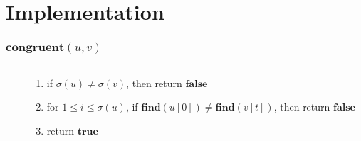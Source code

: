 \documentclass[fleqn,t]{beamer}
\begin{document}
\section{Implementation}

\begin{frame}[fragile]
  \frametitle{$\mathbf{congruent}(u, v)$}

  \begin{columns}[T]
    \begin{column}{0.5\textwidth}
    \end{column}
    \begin{column}{0.5\textwidth}
      \begin{enumerate}
        \item if $\sigma(u) \neq \sigma(v)$, then return $\mathbf{false}$
        \item for $1 \leq i \leq \sigma(u)$, if $\mathbf{find}(u[0]) \neq \mathbf{find}(v[t])$,
          then return $\mathbf{false}$
        \item return $\mathbf{true}$
      \end{enumerate}
    \end{column}
  \end{columns}
\end{frame}
\end{document}
